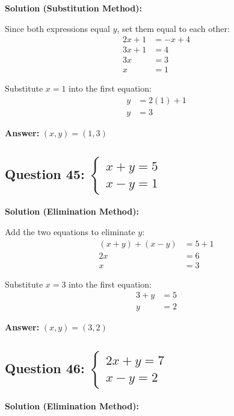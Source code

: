 \documentclass[12pt]{article}
\begin{document}
\noindent\textbf{Solution (Substitution Method):}

Since both expressions equal $y$, set them equal to each other:
\begin{align*}
2x + 1 &= -x + 4 \\
3x + 1 &= 4 \\
3x &= 3 \\
x &= 1
\end{align*}

Substitute $x = 1$ into the first equation:
\begin{align*}
y &= 2(1) + 1 \\
y &= 3
\end{align*}

\textbf{Answer: } $(x, y) = (1, 3)$

\vspace{0.3cm}

\subsection*{Question 45: $\begin{cases} x + y = 5 \\ x - y = 1 \end{cases}$}

\noindent\textbf{Solution (Elimination Method):}

Add the two equations to eliminate $y$:
\begin{align*}
(x + y) + (x - y) &= 5 + 1 \\
2x &= 6 \\
x &= 3
\end{align*}

Substitute $x = 3$ into the first equation:
\begin{align*}
3 + y &= 5 \\
y &= 2
\end{align*}

\textbf{Answer: } $(x, y) = (3, 2)$

\vspace{0.3cm}

\subsection*{Question 46: $\begin{cases} 2x + y = 7 \\ x - y = 2 \end{cases}$}

\noindent\textbf{Solution (Elimination Method):}
\end{document}
